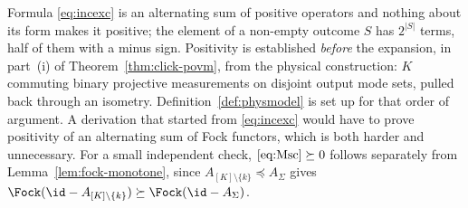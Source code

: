 
\begin{remark}
\label{rem:positivity}
Formula \eqref{eq:incexc} is an alternating sum of positive operators and
nothing about its form makes it positive; the element of a non-empty outcome
$S$ has $2^{|S|}$ terms, half of them with a minus sign. Positivity is established \emph{before} the expansion, in
part~(i) of Theorem~\ref{thm:click-povm}, from the physical construction: $K$
commuting binary projective measurements on disjoint output mode sets, pulled
back through an isometry. Definition~\ref{def:physmodel} is set up for that
order of argument. A derivation that started from \eqref{eq:incexc} would
have to prove positivity of an alternating sum of Fock functors, which is both
harder and unnecessary. For a small independent check,
$\eqref{eq:Msc}\succeq0$ follows separately from
Lemma~\ref{lem:fock-monotone}, since $A_{[K]\setminus\{k\}}\preceq A_\Sigma$ gives
$\Fock(\id-A_{[K]\setminus\{k\}})\succeq\Fock(\id-A_\Sigma)$.
\end{remark}
